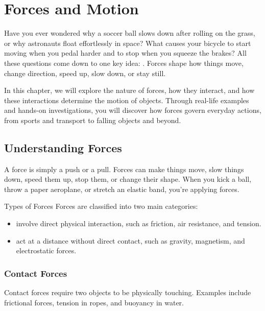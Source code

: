 \chapter{Forces and Motion}

Have you ever wondered why a soccer ball slows down after rolling on the grass, or why astronauts float effortlessly in space? What causes your bicycle to start moving when you pedal harder and to stop when you squeeze the brakes? All these questions come down to one key idea: . Forces shape how things move, change direction, speed up, slow down, or stay still.

In this chapter, we will explore the nature of forces, how they interact, and how these interactions determine the motion of objects. Through real-life examples and hands-on investigations, you will discover how forces govern everyday actions, from sports and transport to falling objects and beyond.

\section{Understanding Forces}

A force is simply a push or a pull. Forces can make things move, slow things down, speed them up, stop them, or change their shape. When you kick a ball, throw a paper aeroplane, or stretch an elastic band, you're applying forces.


\begin{keyconcept}{Types of Forces}
Forces are classified into two main categories:
\begin{itemize}
    \item {} involve direct physical interaction, such as friction, air resistance, and tension.
    \item {} act at a distance without direct contact, such as gravity, magnetism, and electrostatic forces.
\end{itemize}
\end{keyconcept}

\subsection{Contact Forces}

Contact forces require two objects to be physically touching. Examples include frictional forces, tension in ropes, and buoyancy in water.

